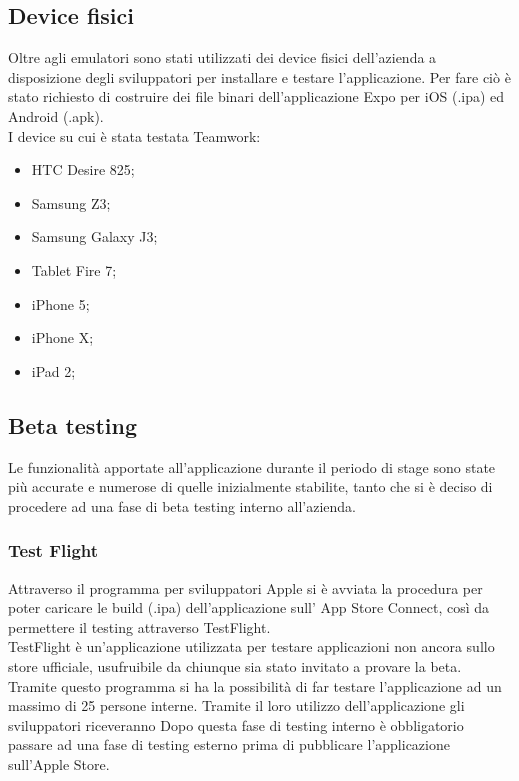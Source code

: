 \subsection{Device fisici}
Oltre agli emulatori sono stati utilizzati dei device fisici dell'azienda a disposizione degli sviluppatori per installare e testare l'applicazione. Per fare ciò è stato richiesto di costruire dei file binari dell'applicazione Expo per iOS (.ipa) ed Android (.apk). \\
I device su cui è stata testata Teamwork:
\begin{itemize}
	\item HTC Desire 825;
	\item Samsung Z3;
	\item Samsung Galaxy J3;
	\item Tablet Fire 7;
	\item iPhone 5;
	\item iPhone X;
	\item iPad 2;
\end{itemize}

\subsection{Beta testing}
Le funzionalità apportate all'applicazione durante il periodo di stage sono state più accurate e numerose di quelle inizialmente stabilite, tanto che si è deciso di procedere ad una fase di beta testing interno all'azienda.\\
\subsubsection{Test Flight}
Attraverso il programma per sviluppatori Apple si è avviata la procedura per poter caricare le build (.ipa) dell'applicazione sull' App Store Connect, così da permettere il testing attraverso TestFlight.\\
TestFlight è un'applicazione utilizzata per testare applicazioni non ancora sullo store ufficiale, usufruibile da chiunque sia stato invitato a provare la beta. Tramite questo programma si ha la possibilità di far testare l'applicazione ad un massimo di 25 persone interne. 
Tramite il loro utilizzo dell'applicazione gli sviluppatori riceveranno 
Dopo questa fase di testing interno è obbligatorio passare ad una fase di testing esterno prima di pubblicare l'applicazione sull'Apple Store.